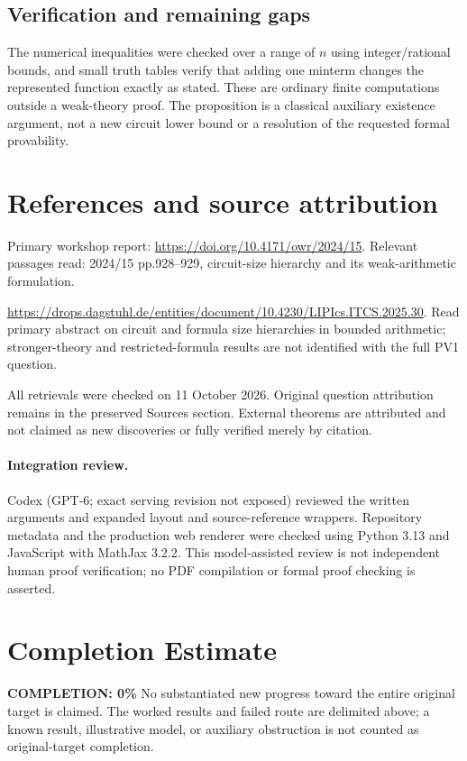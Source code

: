 \documentclass[11pt]{article}
\begin{document}
\subsection{Verification and remaining gaps}
The numerical inequalities were checked over a range of $n$ using integer/rational bounds, and small truth tables verify that adding one minterm changes the represented function exactly as stated. These are ordinary finite computations outside a weak-theory proof. The proposition is a classical auxiliary existence argument, not a new circuit lower bound or a resolution of the requested formal provability.

\section{References and source attribution}
Primary workshop report: \url{https://doi.org/10.4171/owr/2024/15}. Relevant passages read: 2024/15 pp.928--929, circuit-size hierarchy and its weak-arithmetic formulation.

\url{https://drops.dagstuhl.de/entities/document/10.4230/LIPIcs.ITCS.2025.30}. Read primary abstract on circuit and formula size hierarchies in bounded arithmetic; stronger-theory and restricted-formula results are not identified with the full PV1 question.

All retrievals were checked on 11 October 2026. Original question attribution remains in the preserved Sources section. External theorems are attributed and not claimed as new discoveries or fully verified merely by citation.


\paragraph{Integration review.} Codex (GPT-6; exact serving revision not exposed) reviewed the written arguments and expanded layout and source-reference wrappers. Repository metadata and the production web renderer were checked using Python 3.13 and JavaScript with MathJax 3.2.2. This model-assisted review is not independent human proof verification; no PDF compilation or formal proof checking is asserted.

\section{Completion Estimate}
\noindent\textbf{COMPLETION: 0\%}
No substantiated new progress toward the entire original target is claimed. The worked results and failed route are delimited above; a known result, illustrative model, or auxiliary obstruction is not counted as original-target completion.
\end{document}
